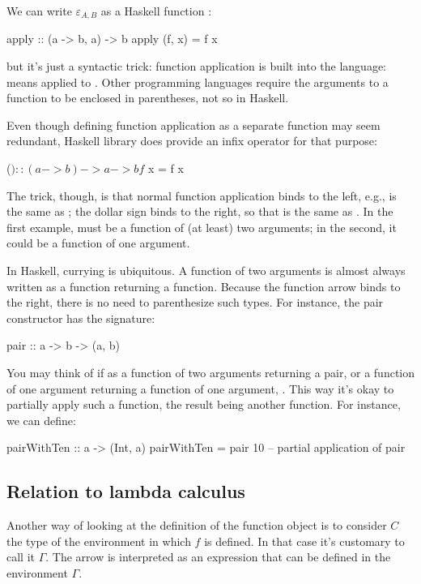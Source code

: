 \documentclass[DaoFP]{subfiles}
\begin{document}
We can write $\varepsilon_{A, B}$ as a Haskell function :
\begin{haskell}
apply :: (a -> b, a) -> b
apply (f, x) = f x
\end{haskell}
but it's just a syntactic trick: function application is built into the language:  means  applied to . Other programming languages require the arguments to a function to be enclosed in parentheses, not so in Haskell. 

Even though defining function application as a separate function may seem redundant, Haskell library does provide an infix operator \hask{$} for that purpose:
\begin{haskell}
($) :: (a -> b) -> a -> b
f $ x = f x
\end{haskell}
The trick, though, is that normal function application binds to the left, e.g.,  is the same as ; the dollar sign binds to the right, so that  is the same as . In the first example,  must be a function of (at least) two arguments; in the second, it could be a function of one argument.

In Haskell, currying is ubiquitous. A function of two arguments is almost always written as a function returning a function. Because the function arrow \hask{->} binds to the right, there is no need to parenthesize such types. For instance, the pair constructor has the signature:
\begin{haskell}
pair :: a -> b -> (a, b)
\end{haskell}
You may think of if as a function of two arguments returning a pair, or a function of one argument returning a function of one argument, . This way it's okay to partially apply such a function, the result being another function. For instance, we can define:
\begin{haskell}
pairWithTen :: a -> (Int, a)
pairWithTen = pair 10 -- partial application of pair
\end{haskell}



\subsection{Relation to lambda calculus}

Another way of looking at the definition of the function object is to consider $C$ the type of the environment in which $f$ is defined. In that case it's customary to call it $\Gamma$. The arrow is interpreted as an expression that can be defined in the environment $\Gamma$. 
\end{document}
